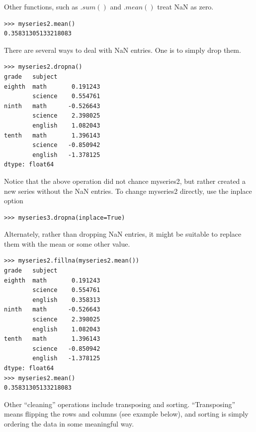 Other functions, such as $.sum()$ and $.mean()$ treat NaN as zero.

\begin{lstlisting}
>>> myseries2.mean()
0.35831305133218083
\end{lstlisting}

There are several ways to deal with NaN entries. One is to simply drop them.

\begin{lstlisting}
>>> myseries2.dropna()
grade   subject
eighth  math       0.191243
        science    0.554761
ninth   math      -0.526643
        science    2.398025
        english    1.082043
tenth   math       1.396143
        science   -0.850942
        english   -1.378125
dtype: float64
\end{lstlisting}

Notice that the above operation did not chance myseries2, but rather created a new series without the NaN entries. To change myseries2 directly, use the inplace option

\begin{lstlisting}
>>> myseries3.dropna(inplace=True)
\end{lstlisting}

Alternately, rather than dropping NaN entries, it might be suitable to replace them with the mean or some other value.

\begin{lstlisting}
>>> myseries2.fillna(myseries2.mean())
grade   subject
eighth  math       0.191243
        science    0.554761
        english    0.358313
ninth   math      -0.526643
        science    2.398025
        english    1.082043
tenth   math       1.396143
        science   -0.850942
        english   -1.378125
dtype: float64
>>> myseries2.mean()
0.35831305133218083
\end{lstlisting}

Other ``cleaning'' operations include transposing and sorting. ``Transposing'' means flipping the rows and columns (see example below), and sorting is simply ordering the data in some meaningful way.

